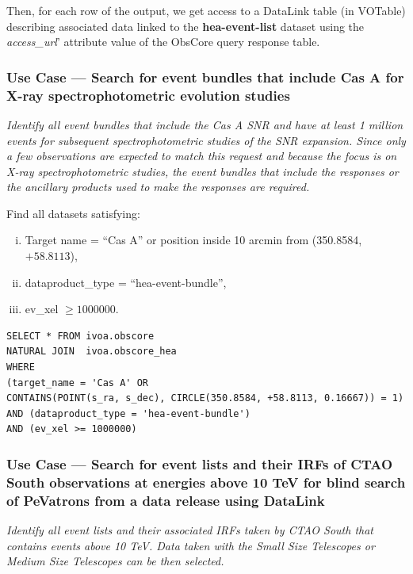 Then, for each row of the output, we get access to a DataLink table (in VOTable) describing associated data linked to the {\bf hea-event-list} dataset using the {\em access\_url\/}' attribute value of the  ObsCore query response table.

\subsubsection{Use Case --- Search for event bundles that include Cas A for X-ray spectrophotometric evolution studies}

{\em Identify all event bundles that include the Cas A SNR and have at least 1 million events for subsequent spectrophotometric studies of the SNR expansion. Since only a few observations are expected to match this request and because the focus is on X-ray spectrophotometric studies, the event bundles that include the responses or the ancillary products used to make the responses are required.\/}

\medskip
\noindent Find all datasets satisfying:
\begin{enumerate}[(i)]
  \item Target name = ``Cas A'' or position inside 10 arcmin from (350.8584, $+58.8113$),
  \item dataproduct\_type = ``hea-event-bundle'',
  \item ev\_xel $\geq 1000000$.
\end{enumerate}

\begin{verbatim}
SELECT * FROM ivoa.obscore
NATURAL JOIN  ivoa.obscore_hea
WHERE
(target_name = 'Cas A' OR
CONTAINS(POINT(s_ra, s_dec), CIRCLE(350.8584, +58.8113, 0.16667)) = 1)
AND (dataproduct_type = 'hea-event-bundle')
AND (ev_xel >= 1000000)
\end{verbatim}

\subsubsection{Use Case --- Search for event lists and their \glspl{IRF} of CTAO South observations at energies above 10 TeV for blind search of PeVatrons from a data release using DataLink}

{\em Identify all event lists and their associated \glspl{IRF} taken by CTAO South that contains events above 10 TeV. Data taken with the Small Size Telescopes or Medium Size Telescopes can be then selected. \/}

